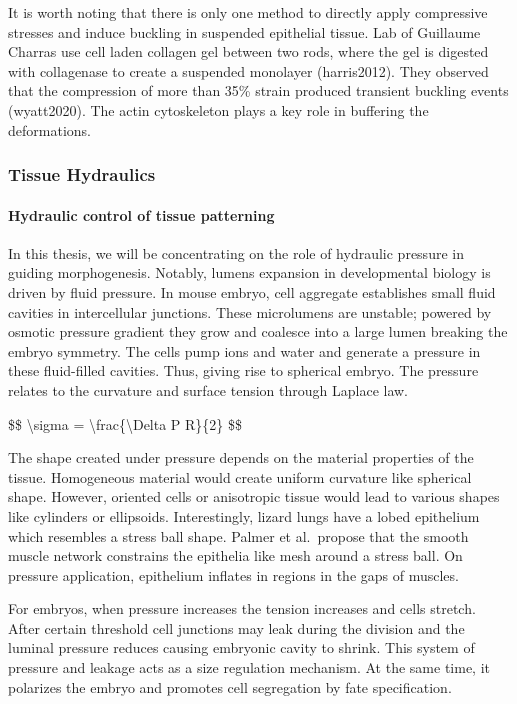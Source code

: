 \documentclass[
]{article}
\begin{document}
It is worth noting that there is only one method to directly apply
compressive stresses and induce buckling in suspended epithelial tissue.
Lab of Guillaume Charras use cell laden collagen gel between two rods,
where the gel is digested with collagenase to create a suspended
monolayer (harris2012). They observed that the compression of more than
35\% strain produced transient buckling events (wyatt2020). The actin
cytoskeleton plays a key role in buffering the deformations.

\hypertarget{tissue-hydraulics}{%
\subsubsection{Tissue Hydraulics}\label{tissue-hydraulics}}

\hypertarget{hydraulic-control-of-tissue-patterning}{%
\paragraph{Hydraulic control of tissue
patterning}\label{hydraulic-control-of-tissue-patterning}}

In this thesis, we will be concentrating on the role of hydraulic
pressure in guiding morphogenesis. Notably, lumens expansion in
developmental biology is driven by fluid pressure. In mouse embryo, cell
aggregate establishes small fluid cavities in intercellular junctions.
These microlumens are unstable; powered by osmotic pressure gradient
they grow and coalesce into a large lumen breaking the embryo symmetry.
The cells pump ions and water and generate a pressure in these
fluid-filled cavities. Thus, giving rise to spherical embryo. The
pressure relates to the curvature and surface tension through Laplace
law.

\$\$ \textbackslash sigma = \textbackslash frac\{\textbackslash Delta P
R\}\{2\} \$\$

The shape created under pressure depends on the material properties of
the tissue. Homogeneous material would create uniform curvature like
spherical shape. However, oriented cells or anisotropic tissue would
lead to various shapes like cylinders or ellipsoids. Interestingly,
lizard lungs have a lobed epithelium which resembles a stress ball
shape. Palmer et al.~propose that the smooth muscle network constrains
the epithelia like mesh around a stress ball. On pressure application,
epithelium inflates in regions in the gaps of muscles.

For embryos, when pressure increases the tension increases and cells
stretch. After certain threshold cell junctions may leak during the
division and the luminal pressure reduces causing embryonic cavity to
shrink. This system of pressure and leakage acts as a size regulation
mechanism. At the same time, it polarizes the embryo and promotes cell
segregation by fate specification.
\end{document}
